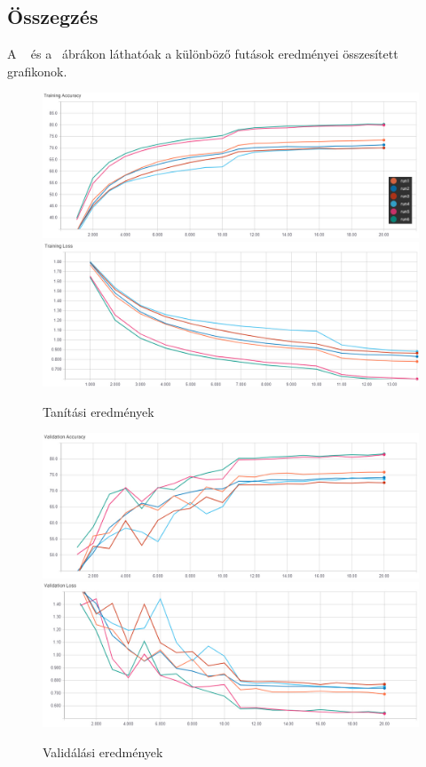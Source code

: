 \newpage
\subsection{Összegzés}
A ~ és a ~ábrákon láthatóak a különböző futások eredményei összesített grafikonok. 
\begin{figure}[!h]
	\centering
	\includegraphics[width=125mm, keepaspectratio]{figures/m07/train_acc2.jpg}\\\vspace{2mm}
	\includegraphics[width=125mm, keepaspectratio]{figures/m07/train_loss.jpg}
	\caption{Tanítási eredmények}
	\label{fig:Train}
\end{figure}
\begin{figure}[!h]
	\centering
	\includegraphics[width=125mm, keepaspectratio]{figures/m07/val_acc.jpg}\\\vspace{2mm}
	\includegraphics[width=125mm, keepaspectratio]{figures/m07/val_loss.jpg}
	\caption{Validálási eredmények}
	\label{fig:Val}
\end{figure}

